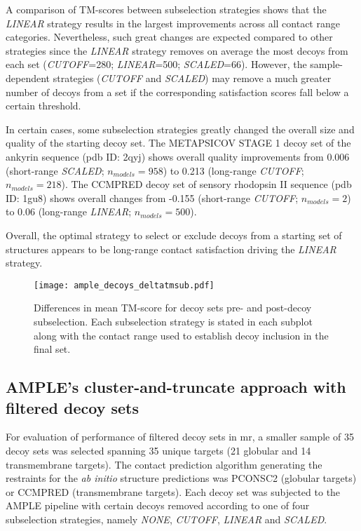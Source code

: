 A comparison of \textDelta TM-scores between subselection strategies shows that the \textit{LINEAR} strategy results in the largest improvements across all contact range categories. Nevertheless, such great changes are expected compared to other strategies since the \textit{LINEAR} strategy removes on average the most decoys from each set (\textit{CUTOFF}=280; \textit{LINEAR}=500; \textit{SCALED}=66). However, the sample-dependent strategies (\textit{CUTOFF} and \textit{SCALED}) may remove a much greater number of decoys from a set if the corresponding satisfaction scores fall below a certain threshold.

In certain cases, some subselection strategies greatly changed the overall size and quality of the starting decoy set. The METAPSICOV STAGE 1 decoy set of the ankyrin sequence (\gls{pdb} ID: 2qyj) shows overall quality improvements from 0.006 (short-range \textit{SCALED}; $n_{models}=958$) to 0.213 (long-range \textit{CUTOFF}; $n_{models}=218$). The CCMPRED decoy set of sensory rhodopsin II sequence (\gls{pdb} ID: 1gu8) shows overall changes from -0.155 (short-range \textit{CUTOFF}; $n_{models}=2$) to 0.06 (long-range \textit{LINEAR}; $n_{models}=500$).

Overall, the optimal strategy to select or exclude decoys from a starting set of structures appears to be long-range contact satisfaction driving the \textit{LINEAR} strategy.

\begin{figure}[H]
	\centering
	\texttt{[image: ample\_decoys\_deltatmsub.pdf]}
        \caption[TM-score comparison pre- and post-decoy subselection]{Differences in mean TM-score  for decoy sets pre- and post-decoy subselection. Each subselection strategy is stated in each subplot along with the contact range used to establish decoy inclusion in the final set.}
	\label{fig:ample_decoys_deltatmsub}
\end{figure}

\subsection{AMPLE's cluster-and-truncate approach with filtered decoy sets}
For evaluation of performance of filtered decoy sets in \gls{mr}, a smaller sample of 35 decoy sets was selected spanning 35 unique targets (21 globular and 14 transmembrane targets). The contact prediction algorithm generating the restraints for the \textit{ab initio} structure predictions was PCONSC2 (globular targets) or CCMPRED (transmembrane targets). Each decoy set was subjected to the AMPLE pipeline with certain decoys removed according to one of four subselection strategies, namely \textit{NONE}, \textit{CUTOFF}, \textit{LINEAR} and \textit{SCALED}.

